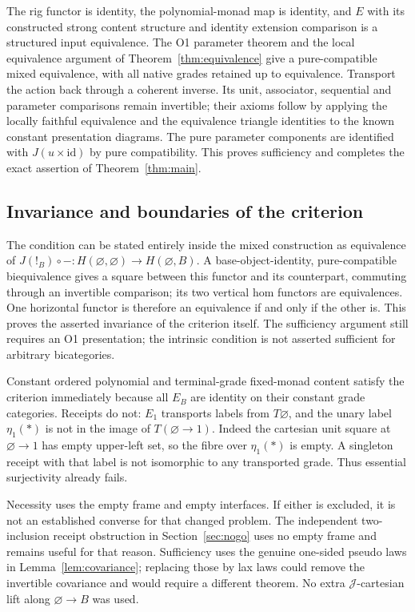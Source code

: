 \documentclass[11pt,a4paper]{article}
\theoremstyle{definition}
\newcommand{\J}{\mathcal J}
\newcommand{\id}{\mathrm{id}}
\begin{document}
The rig functor is identity, the polynomial-monad map is identity, and
$E$ with its constructed strong content structure and identity extension
comparison is a structured input equivalence. The O1 parameter theorem
and the local equivalence argument of Theorem~\ref{thm:equivalence} give
a pure-compatible mixed equivalence, with all native grades retained up
to equivalence. Transport the action back through a coherent inverse.
Its unit, associator, sequential and parameter comparisons remain
invertible; their axioms follow by applying the locally faithful
equivalence and the equivalence triangle identities to the known constant
presentation diagrams. The pure parameter components are identified with
$J(u\times\id)$ by pure compatibility. This proves sufficiency and completes
the exact assertion of Theorem~\ref{thm:main}.

\subsection{Invariance and boundaries of the criterion}
The condition can be stated entirely inside the mixed construction as
equivalence of $J(!_B)\circ-:H(\varnothing,\varnothing)\to
H(\varnothing,B)$. A base-object-identity, pure-compatible biequivalence
gives a square between this functor and its counterpart, commuting through
an invertible comparison; its two vertical hom functors are equivalences.
One horizontal functor is therefore an equivalence if and only if the other
is. This proves the asserted invariance of the criterion itself.
The sufficiency argument still requires an O1 presentation; the intrinsic
condition is not asserted sufficient for arbitrary bicategories.

Constant ordered polynomial and terminal-grade fixed-monad content satisfy
the criterion immediately because all $E_B$ are identity on their constant
grade categories. Receipts do not: $E_1$ transports labels from $T\varnothing$,
and the unary label $\eta_1(*)$ is not in the image of
$T(\varnothing\to1)$. Indeed the cartesian unit square at
$\varnothing\to1$ has empty upper-left set, so the fibre over
$\eta_1(*)$ is empty. A singleton receipt with that label is not isomorphic
to any transported grade. Thus essential surjectivity already fails.

Necessity uses the empty frame and empty interfaces. If either is excluded,
it is not an established converse for that changed problem. The independent
two-inclusion receipt obstruction in Section~\ref{sec:nogo} uses no empty
frame and remains useful for that reason. Sufficiency uses the genuine
one-sided pseudo laws in Lemma~\ref{lem:covariance}; replacing those by lax
laws could remove the invertible covariance and would require a different
theorem. No extra $\J$-cartesian lift along $\varnothing\to B$ was used.
\end{document}
